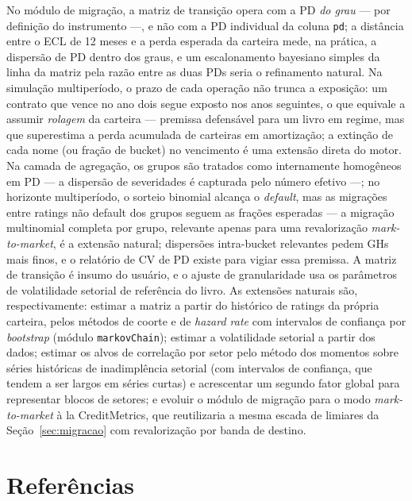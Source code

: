 \documentclass[11pt,a4paper]{article}
\begin{document}
No módulo de migração, a matriz de transição opera com a PD \emph{do grau} --- por definição do instrumento ---, e não com a PD individual da coluna \texttt{pd}; a distância entre o ECL de 12 meses e a perda esperada da carteira mede, na prática, a dispersão de PD dentro dos graus, e um escalonamento bayesiano simples da linha da matriz pela razão entre as duas PDs seria o refinamento natural. Na simulação multiperíodo, o prazo de cada operação não trunca a exposição: um contrato que vence no ano dois segue exposto nos anos seguintes, o que equivale a assumir \emph{rolagem} da carteira --- premissa defensável para um livro em regime, mas que superestima a perda acumulada de carteiras em amortização; a extinção de cada nome (ou fração de bucket) no vencimento é uma extensão direta do motor. Na camada de agregação, os grupos são tratados como internamente homogêneos em PD --- a dispersão de severidades é capturada pelo número efetivo ---; no horizonte multiperíodo, o sorteio binomial alcança o \emph{default}, mas as migrações entre ratings não default dos grupos seguem as frações esperadas --- a migração multinomial completa por grupo, relevante apenas para uma revalorização \emph{mark-to-market}, é a extensão natural; dispersões intra-bucket relevantes pedem GHs mais finos, e o relatório de CV de PD existe para vigiar essa premissa. A matriz de transição é insumo do usuário, e o ajuste de granularidade usa os parâmetros de volatilidade setorial de referência do livro. As extensões naturais são, respectivamente: estimar a matriz a partir do histórico de ratings da própria carteira, pelos métodos de coorte e de \emph{hazard rate} com intervalos de confiança por \emph{bootstrap} (módulo \texttt{markovChain}); estimar a volatilidade setorial a partir dos dados; estimar os alvos de correlação por setor pelo método dos momentos sobre séries históricas de inadimplência setorial (com intervalos de confiança, que tendem a ser largos em séries curtas) e acrescentar um segundo fator global para representar blocos de setores; e evoluir o módulo de migração para o modo \emph{mark-to-market} à la CreditMetrics, que reutilizaria a mesma escada de limiares da Seção~\ref{sec:migracao} com revalorização por banda de destino.

\section*{Referências}
\end{document}
